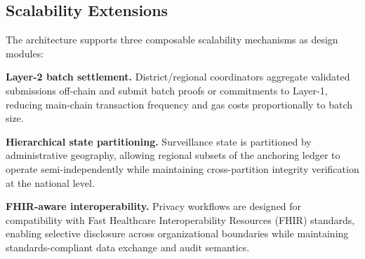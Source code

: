 \documentclass[AMA,LATO1COL]{WileyNJD-v2}
\begin{document}
%
%
%
%
%
%
%

\subsection{Scalability Extensions}\label{subsec:scalability}

The architecture supports three composable scalability mechanisms as design modules:

\textbf{Layer-2 batch settlement.} District/regional coordinators aggregate validated submissions off-chain and submit batch proofs or commitments to Layer-1, reducing main-chain transaction frequency and gas costs proportionally to batch size.

\textbf{Hierarchical state partitioning.} Surveillance state is partitioned by administrative geography, allowing regional subsets of the anchoring ledger to operate semi-independently while maintaining cross-partition integrity verification at the national level.

\textbf{FHIR-aware interoperability.} Privacy workflows are designed for compatibility with Fast Healthcare Interoperability Resources (FHIR) standards, enabling selective disclosure across organizational boundaries while maintaining standards-compliant data exchange and audit semantics.
\end{document}
